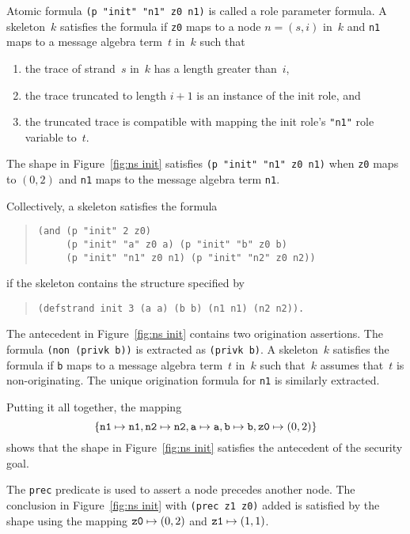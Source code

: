 \documentclass[12pt]{article}
\begin{document}
Atomic formula \texttt{(p "init" "n1" z0 n1)} is called a role
parameter formula.  A skeleton~$k$ satisfies the formula if
\texttt{z0} maps to a node $n=(s,i)$ in~$k$ and \texttt{n1} maps to a
message algebra term~$t$ in~$k$ such that
\begin{enumerate}
\item the trace of strand~$s$ in~$k$ has a length greater than~$i$,
\item the trace truncated to length $i+1$ is an instance of the
  init role, and
\item the truncated trace is compatible with mapping the init role's
  \texttt{"n1"} role variable to~$t$.
\end{enumerate}
The shape in Figure~\ref{fig:ns init} satisfies \texttt{(p "init" "n1"
  z0 n1)} when \texttt{z0} maps to $(0,2)$ and \texttt{n1} maps to the
message algebra term \texttt{n1}.

Collectively, a skeleton satisfies the formula
\begin{quote}
\begin{verbatim}
(and (p "init" 2 z0)
     (p "init" "a" z0 a) (p "init" "b" z0 b)
     (p "init" "n1" z0 n1) (p "init" "n2" z0 n2))
\end{verbatim}
\end{quote}
if the skeleton contains the structure specified by
\begin{quote}
\begin{verbatim}
(defstrand init 3 (a a) (b b) (n1 n1) (n2 n2)).
\end{verbatim}
\end{quote}

The antecedent in Figure~\ref{fig:ns init} contains two origination
assertions.  The formula \texttt{(non (privk b))} is extracted as
\texttt{(privk b)}.  A skeleton~$k$ satisfies the formula if
\texttt{b} maps to a message algebra term~$t$ in~$k$ such that~$k$
assumes that~$t$ is non-originating.  The unique origination formula for
\texttt{n1} is similarly extracted.

Putting it all together, the mapping
\[\{\mathtt{n1}\mapsto\mathtt{n1},
\mathtt{n2}\mapsto\mathtt{n2}, \mathtt{a}\mapsto\mathtt{a},
\mathtt{b}\mapsto\mathtt{b},\mbox{\tt z0}\mapsto(0,2)\}\] shows that
the shape in Figure~\ref{fig:ns init} satisfies the antecedent of the
security goal.

The \texttt{prec} predicate is used to assert a node precedes another
node.  The conclusion in Figure~\ref{fig:ns init} with \texttt{(prec
  z1 z0)} added is satisfied by the shape using the mapping $\mbox{\tt
  z0}\mapsto(0,2)$ and $\mbox{\tt z1}\mapsto(1,1)$.
\end{document}
